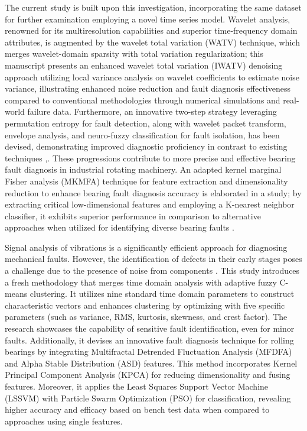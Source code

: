 \documentclass[sn-basic,pdflatex]{sn-jnl}
\theoremstyle{remark}
\theoremstyle{definition}
\begin{document}
The current study is built upon this investigation, incorporating the
same dataset for further examination employing a novel time series
model. Wavelet analysis, renowned for its multiresolution capabilities
and superior time-frequency domain attributes, is augmented by the
wavelet total variation (WATV) technique, which merges wavelet-domain
sparsity with total variation regularization; this manuscript presents
an enhanced wavelet total variation (IWATV) denoising approach utilizing
local variance analysis on wavelet coefficients to estimate noise
variance, illustrating enhanced noise reduction and fault diagnosis
effectiveness compared to conventional methodologies through numerical
simulations and real-world failure data. Furthermore, an innovative
two-step strategy leveraging permutation entropy for fault detection,
along with wavelet packet transform, envelope analysis, and neuro-fuzzy
classification for fault isolation, has been devised, demonstrating
improved diagnostic proficiency in contrast to existing techniques
\citep{WOS:000385104500001},\citep{RAJABI:2022117754}. These
progressions contribute to more precise and effective bearing fault
diagnosis in industrial rotating machinery. An adapted kernel marginal
Fisher analysis (MKMFA) technique for feature extraction and
dimensionality reduction to enhance bearing fault diagnosis accuracy is
elaborated in a study; by extracting critical low-dimensional features
and employing a K-nearest neighbor classifier, it exhibits superior
performance in comparison to alternative approaches when utilized for
identifying diverse bearing faults \citep{WOS:000392016300001}.

Signal analysis of vibrations is a significantly efficient approach for
diagnosing mechanical faults. However, the identification of defects in
their early stages poses a challenge due to the presence of noise from
components \citep[\citet{WOS:000367992900001}]{WOS:000369301600001}.
This study introduces a fresh methodology that merges time domain
analysis with adaptive fuzzy C-means clustering. It utilizes nine
standard time domain parameters to construct characteristic vectors and
enhances clustering by optimizing with five specific parameters (such as
variance, RMS, kurtosis, skewness, and crest factor). The research
showcases the capability of sensitive fault identification, even for
minor faults. Additionally, it devises an innovative fault diagnosis
technique for rolling bearings by integrating Multifractal Detrended
Fluctuation Analysis (MFDFA) and Alpha Stable Distribution (ASD)
features. This method incorporates Kernel Principal Component Analysis
(KPCA) for reducing dimensionality and fusing features. Moreover, it
applies the Least Squares Support Vector Machine (LSSVM) with Particle
Swarm Optimization (PSO) for classification, revealing higher accuracy
and efficacy based on bench test data when compared to approaches using
single features.
\end{document}
